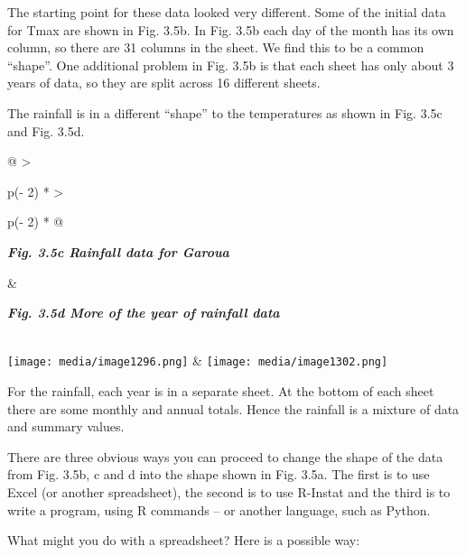 \documentclass[
  letterpaper,
  DIV=11,
  numbers=noendperiod]{scrreprt}
\begin{document}
The starting point for these data looked very different. Some of the
initial data for Tmax are shown in Fig. 3.5b. In Fig. 3.5b each day of
the month has its own column, so there are 31 columns in the sheet. We
find this to be a common ``shape''. One additional problem in Fig. 3.5b
is that each sheet has only about 3 years of data, so they are split
across 16 different sheets.

The rainfall is in a different ``shape'' to the temperatures as shown in
Fig. 3.5c and Fig. 3.5d.

\begin{longtable}[]{@{}
  >{\raggedright\arraybackslash}p{(\columnwidth - 2\tabcolsep) * }
  >{\raggedright\arraybackslash}p{(\columnwidth - 2\tabcolsep) * }@{}}
\toprule\noalign{}
\begin{minipage}[b]{\linewidth}\raggedright
\textbf{\emph{Fig. 3.5c Rainfall data for Garoua}}
\end{minipage} & \begin{minipage}[b]{\linewidth}\raggedright
\textbf{\emph{Fig. 3.5d More of the year of rainfall data}}
\end{minipage} \\
\midrule\noalign{}
\endhead
\bottomrule\noalign{}
\endlastfoot
\texttt{[image: media/image1296.png]}
&
\texttt{[image: media/image1302.png]} \\
\end{longtable}

For the rainfall, each year is in a separate sheet. At the bottom of
each sheet there are some monthly and annual totals. Hence the rainfall
is a mixture of data and summary values.

There are three obvious ways you can proceed to change the shape of the
data from Fig. 3.5b, c and d into the shape shown in Fig. 3.5a. The
first is to use Excel (or another spreadsheet), the second is to use
R-Instat and the third is to write a program, using R commands -- or
another language, such as Python.

What might you do with a spreadsheet? Here is a possible way:
\end{document}
